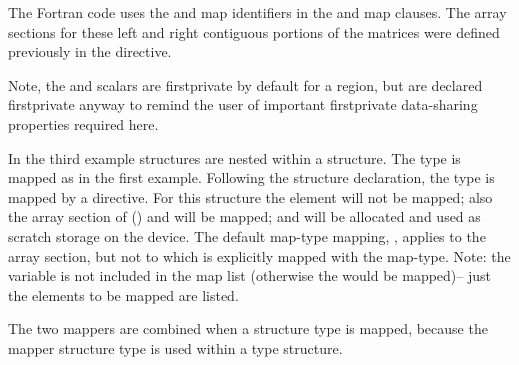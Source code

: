 The Fortran code uses the  and  map identifiers in the
 and  map clauses.  
The array sections for these left and right contiguous portions of the matrices 
were defined previously in the  directive.

Note, the  and  scalars are firstprivate 
by default for a  region, but are declared firstprivate anyway
to remind the user of important firstprivate data-sharing properties required here.



In the third example  structures are
nested within a  structure. The  type is mapped
as in the first example.  Following the  structure declaration, 
the  type is mapped by a  directive.
For this structure the  element will not be mapped;
also the array section of  () and  will be mapped; and
 will be allocated and used as scratch storage on the device.
The default map-type mapping, , applies to the  array section,
but not to  which is explicitly mapped with the  map-type. 
Note: the variable  is not included in the map list (otherwise
the  would be mapped)-- just the elements 
to be mapped are listed.

The two mappers are combined when a  structure type is mapped,
because the mapper  structure type is used within a 
type structure.



